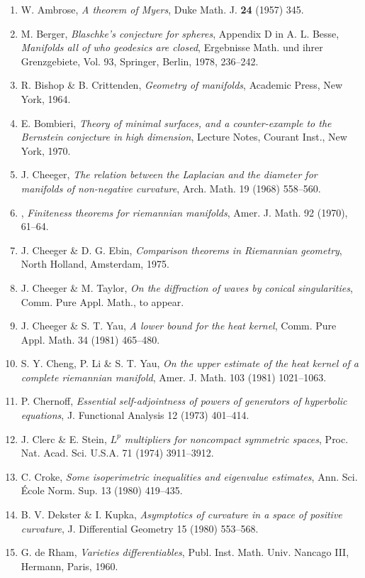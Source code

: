 \begin{enumerate}
\item W. Ambrose, \emph{A theorem of Myers}, Duke Math. J. \textbf{24} (1957) 345.
\item M. Berger, \emph{Blaschke's conjecture for spheres}, Appendix D in A. L. Besse,
\emph{Manifolds all of who geodesics are closed}, Ergebnisse Math. und ihrer Grenzgebiete,
Vol. 93, Springer, Berlin, 1978, 236--242.
\item R. Bishop \& B. Crittenden, \emph{Geometry of manifolds}, Academic Press, New York, 1964.
\item E. Bombieri, \emph{Theory of minimal surfaces, and a counter-example to the Bernstein conjecture in
high dimension}, Lecture Notes, Courant Inst., New York, 1970.
\item J. Cheeger, \textit{The relation between the Laplacian and the diameter for manifolds of non-negative curvature}, Arch. Math. 19 (1968) 558--560.
\item \underline{\hspace{2em}}, \textit{Finiteness theorems for riemannian manifolds}, Amer. J. Math. 92 (1970), 61--64.
\item J. Cheeger \& D. G. Ebin, \textit{Comparison theorems in Riemannian geometry}, North Holland, Amsterdam, 1975.
\item J. Cheeger \& M. Taylor, \textit{On the diffraction of waves by conical singularities}, Comm. Pure Appl. Math., to appear.
\item J. Cheeger \& S. T. Yau, \textit{A lower bound for the heat kernel}, Comm. Pure Appl. Math. 34 (1981) 465--480.
\item S. Y. Cheng, P. Li \& S. T. Yau, \textit{On the upper estimate of the heat kernel of a complete riemannian manifold}, Amer. J. Math. 103 (1981) 1021--1063.
\item P. Chernoff, \textit{Essential self-adjointness of powers of generators of hyperbolic equations}, J. Functional Analysis 12 (1973) 401--414.
\item J. Clerc \& E. Stein, \textit{$L^p$ multipliers for noncompact symmetric spaces}, Proc. Nat. Acad. Sci. U.S.A. 71 (1974) 3911--3912.
\item C. Croke, \textit{Some isoperimetric inequalities and eigenvalue estimates}, Ann. Sci. \'{E}cole Norm. Sup. 13 (1980) 419--435.
\item B. V. Dekster \& I. Kupka, \textit{Asymptotics of curvature in a space of positive curvature}, J. Differential Geometry 15 (1980) 553--568.
\item G. de Rham, \textit{Varieties differentiables}, Publ. Inst. Math. Univ. Nancago III, Hermann, Paris, 1960.

\end{enumerate}
